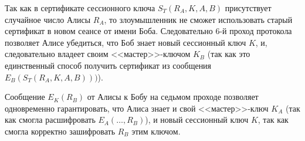 Так как в сертификате сессионного ключа $S_T (R_A, K, A, B)$ присутствует случайное число Алисы $R_A$, то злоумышленник не сможет использовать старый сертификат в новом сеансе от имени Боба. Следовательно 6-й проход протокола позволяет Алисе убедиться, что Боб знает новый сессионный ключ $K$, и, следовательно владеет своим <<мастер>>-ключом $K_B$ (так как это единственный способ получить сертификат из сообщения $E_B ( S_T ( R_A, K, A, B ) ))$).

Сообщение $E_K( R_B )$ от Алисы к Бобу на седьмом проходе позволяет одновременно гарантировать, что Алиса знает и свой <<мастер>>-ключ $K_A$ (так как смогла расшифровать $E_A(\dots, R_B)$), и новый сессионный ключ $K$, так как смогла корректно зашифровать $R_B$ этим ключом.

